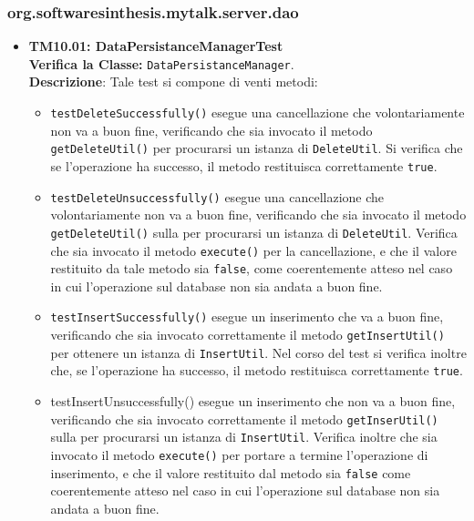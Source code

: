 \subsubsection{org.softwaresinthesis.mytalk.server.dao}
\begin{itemize}


\item \textbf{TM10.01: DataPersistanceManagerTest}\\
\textbf{Verifica la Classe:} \texttt{DataPersistanceManager}.\\
\textbf{Descrizione}: %
Tale test si compone di venti metodi:
\begin{itemize}

\item \texttt{testDeleteSuccessfully()} esegue una cancellazione che volontariamente non va a buon fine, verificando che sia invocato il metodo \texttt{getDeleteUtil()} per procurarsi  un istanza di \texttt{DeleteUtil}. Si verifica che se l'operazione ha successo, il metodo restituisca correttamente \texttt{true}.

\item \texttt{testDeleteUnsuccessfully()} esegue una cancellazione che volontariamente non va a buon fine, verificando che sia invocato il metodo \texttt{getDeleteUtil()} sulla  per procurarsi  un istanza di \texttt{DeleteUtil}. Verifica che sia invocato il metodo \texttt{execute()} per la cancellazione, e che il valore restituito da tale metodo sia \texttt{false}, come coerentemente atteso nel caso in cui l'operazione sul database non sia andata a buon fine.

\item \texttt{testInsertSuccessfully()} esegue un inserimento che va a buon fine, verificando che sia invocato correttamente il metodo \texttt{getInsertUtil()} per ottenere un istanza di \texttt{InsertUtil}. Nel corso del test si verifica inoltre che, se l'operazione ha successo, il metodo restituisca correttamente \texttt{true}.

\item \texttt{}testInsertUnsuccessfully() esegue un inserimento che non va a buon fine, verificando che sia invocato correttamente il metodo \texttt{getInserUtil()} sulla  per procurarsi un istanza di \texttt{InsertUtil}. Verifica inoltre che sia invocato il metodo \texttt{execute()} per portare a termine l'operazione di inserimento, e che il valore restituito dal metodo sia \texttt{false} come coerentemente atteso nel caso in cui l'operazione sul database non sia andata a buon fine.


\end{itemize}
\end{itemize}
